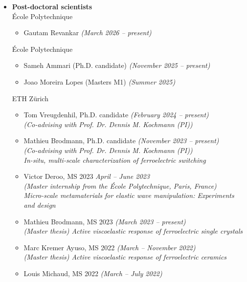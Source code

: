 \documentclass[a4paper,10pt, oneside]{article}
\begin{document}
	\begin{itemize}[wide, labelwidth=!, labelindent=-1em]
		\item[]\textbf{Post-doctoral scientists} \\
		{\'E}cole Polytechnique
		\begin{itemize}[wide, labelwidth=!, labelindent=0em]
			\item Gautam Revankar \hfill \textit{(March 2026 -- present)}
		\end{itemize}
		{\'E}cole Polytechnique
		\begin{itemize}[wide, labelwidth=!, labelindent=0em]
			\item Sameh Ammari (Ph.D. candidate) \hfill \textit{(November 2025 -- present)}
			\item Joao Moreira Lopes (Masters M1) \hfill \textit{(Summer 2025)} 
		\end{itemize}
		ETH Z\"{u}rich
		\begin{itemize}[wide, labelwidth=!, labelindent=0em]
			\item Tom Vreugdenhil, Ph.D. candidate \hfill \textit{(February 2024 -- present)} \\
			\textit{(Co-advising with Prof. Dr. Dennis M. Kochmann (PI))}
			\item Mathieu Brodmann, Ph.D. candidate \hfill \textit{(November 2023 -- present)} \\
			\textit{(Co-advising with Prof. Dr. Dennis M. Kochmann (PI))} \\ 
			\textit{In-situ, multi-scale characterization of ferroelectric switching}
			\item Victor Deroo, MS 2023 \hfill \textit{April -- June 2023} \\
			\textit{(Master internship from the \'{E}cole Polytechnique, Paris, France) \\
				Micro-scale metamaterials for elastic wave manipulation: Experiments and design}
			\item Mathieu Brodmann, MS 2023 \hfill \textit{(March 2023 -- present)} \\
			\textit{(Master thesis) Active viscoelastic response of ferroelectric single crystals}
			\item Marc Kremer Ayuso, MS 2022 \hfill \textit{(March -- November 2022)} \\
			\textit{(Master thesis) Active viscoelastic response of ferroelectric ceramics}
			\item Louis Michaud, MS 2022  \hfill \textit{(March -- July 2022)} \\

\end{itemize}
\end{itemize}
\end{document}
